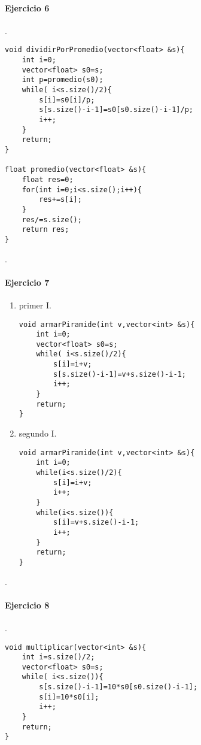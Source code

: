 \documentclass{article}
\begin{document}
\paragraph*{Ejercicio 6}.

\begin{lstlisting}
void dividirPorPromedio(vector<float> &s){
	int i=0;
	vector<float> s0=s;
	int p=promedio(s0);
	while( i<s.size()/2){
		s[i]=s0[i]/p;
		s[s.size()-i-1]=s0[s0.size()-i-1]/p;
		i++;
	}
	return;
}

float promedio(vector<float> &s){
	float res=0;
	for(int i=0;i<s.size();i++){
		res+=s[i];	
	}
	res/=s.size();
	return res;
}
\end{lstlisting}

.
\paragraph*{Ejercicio 7}
\begin{enumerate}[label=\alph*)]
\item primer I.\\
\begin{lstlisting}
void armarPiramide(int v,vector<int> &s){
	int i=0;
	vector<float> s0=s;
	while( i<s.size()/2){
		s[i]=i+v;
		s[s.size()-i-1]=v+s.size()-i-1;
		i++;
	}
	return;
}
\end{lstlisting}
\item segundo I.\\
 \begin{lstlisting}
void armarPiramide(int v,vector<int> &s){
	int i=0;
	while(i<s.size()/2){
		s[i]=i+v;
		i++;	
	}
	while(i<s.size()){
		s[i]=v+s.size()-i-1;
		i++;	
	}
	return;
}
\end{lstlisting}
\end{enumerate}
.
\paragraph*{Ejercicio 8}.

\begin{lstlisting}
void multiplicar(vector<int> &s){
	int i=s.size()/2;
	vector<float> s0=s;
	while( i<s.size()){
		s[s.size()-i-1]=10*s0[s0.size()-i-1];
		s[i]=10*s0[i];
		i++;
	}
	return;
}
\end{lstlisting}
\end{document}
